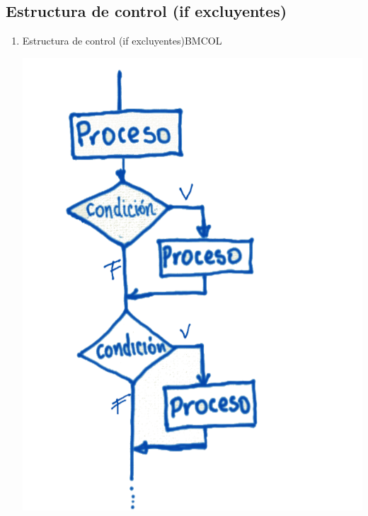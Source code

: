 \documentclass[presentation, aspectratio=54]{beamer}
\begin{document}
\subsection{Estructura de control (if excluyentes)}
\label{sec:org7acf5ce}
\begin{enumerate}
\item Estructura de control (if excluyentes)\hfill{}\textsc{BMCOL}
\label{sec:orgef8638f}
\begin{center}
\includegraphics[width=.9\linewidth]{./images/codigo/ifexcluyentes.png}
\end{center}


\end{enumerate}
\end{document}
